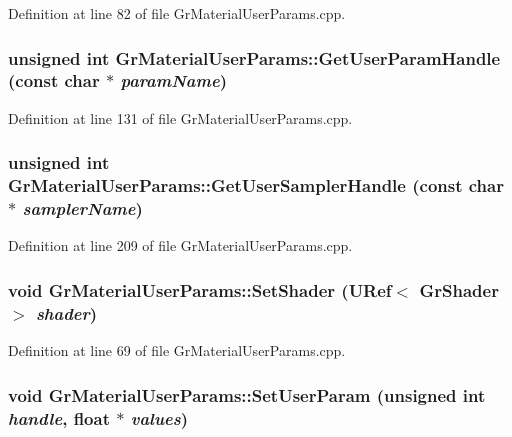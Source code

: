 Definition at line 82 of file GrMaterialUserParams.cpp.\hypertarget{class_gr_material_user_params_29289f87a4720e07e3ad984cd6110600}{
\subsubsection[{GetUserParamHandle}]{\setlength{\rightskip}{0pt plus 5cm}unsigned int GrMaterialUserParams::GetUserParamHandle (const char $\ast$ {\em paramName})}}
\label{class_gr_material_user_params_29289f87a4720e07e3ad984cd6110600}




Definition at line 131 of file GrMaterialUserParams.cpp.\hypertarget{class_gr_material_user_params_a4e2483fc93c735416c8cfa9f0a7bca7}{
\subsubsection[{GetUserSamplerHandle}]{\setlength{\rightskip}{0pt plus 5cm}unsigned int GrMaterialUserParams::GetUserSamplerHandle (const char $\ast$ {\em samplerName})}}
\label{class_gr_material_user_params_a4e2483fc93c735416c8cfa9f0a7bca7}




Definition at line 209 of file GrMaterialUserParams.cpp.\hypertarget{class_gr_material_user_params_bda3aa38ee94e010cf642e3c3c75bff7}{
\subsubsection[{SetShader}]{\setlength{\rightskip}{0pt plus 5cm}void GrMaterialUserParams::SetShader ({\bf URef}$<$ {\bf GrShader} $>$ {\em shader})}}
\label{class_gr_material_user_params_bda3aa38ee94e010cf642e3c3c75bff7}




Definition at line 69 of file GrMaterialUserParams.cpp.\hypertarget{class_gr_material_user_params_f7ddd09376271494d32494837c58e08c}{
\subsubsection[{SetUserParam}]{\setlength{\rightskip}{0pt plus 5cm}void GrMaterialUserParams::SetUserParam (unsigned int {\em handle}, \/  float $\ast$ {\em values})}}
\label{class_gr_material_user_params_f7ddd09376271494d32494837c58e08c}




